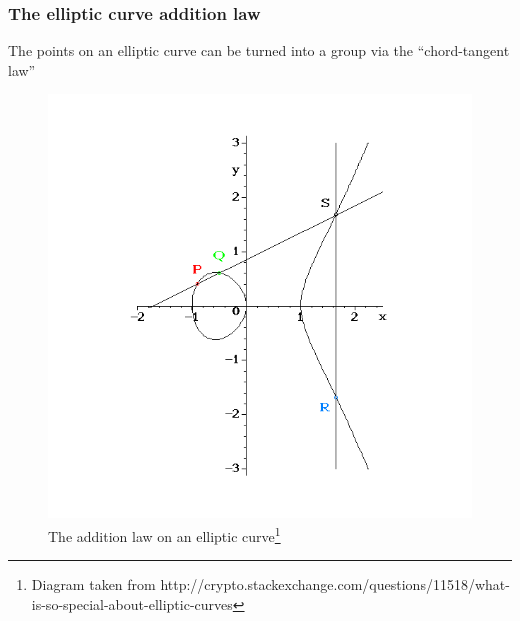 \documentclass{beamer}
\begin{document}
\begin{frame} %
\frametitle{The elliptic curve addition law}
The points on an elliptic curve can be turned into a group via the ``chord-tangent law''
\begin{figure}[htpb]
	\centering
	\includegraphics[scale=0.25]{addition.png}
	\caption{The addition law on an elliptic curve\footnote{Diagram taken from http://crypto.stackexchange.com/questions/11518/what-is-so-special-about-elliptic-curves}}
\end{figure}
\end{frame}
\end{document}
